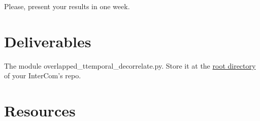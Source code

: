Please, present your results in one week.

\section{Deliverables}

The module overlapped\_ttemporal\_decorrelate.py. Store it at the
\href{https://github.com/Tecnologias-multimedia/intercom}{root
  directory} of your InterCom's repo.

\section{Resources}



\begin{comment}

  The Figure~\ref{fig:transform_coding} shows the stages that are
  tipycally involved in a transform-based signal compression system.

\begin{figure}
  \begin{center}
\begin{verbatim}
   s   +---+   w    +---+   k    +---+    c
 ----->| T |------->| Q |------->| E |-----------+
  (s)  +---+  (s)   +---+  (~s)  +---+   (~s)    |
samples   coefficients   indexes      code-words ~
                                                 :
                                                 ~
   ~s  +---+    w   +---+   k    +---+           |
 <-----| t |<-------| q |<-------| D |<----------+
  (~s) +---+  (~s)  +---+  (~s)  +---+
approx.    quantized     indexes
samples   coefficients
\end{verbatim}                
  \end{center}
  \caption{Common data-flow used un Transform Coding. $s$ represents
    the signal to compress, $\tilde{s}$ the lossy version of the
    reconstructed signal, $T$ the (forward) transform (which takes blocks of
    samples) producing blocks of coefficients $w$, $Q$ the scalar
    quantization stage (which takes single coefficients) producing
    quantization indexes $k$, $E$ the entropy encoder (which in our
    case (DEFLATE) works with blocks of coefficients) producing
    code-words $c$, $D$ the entropy decoder, $q$ the decuantization
    stage, and $t$ the inverse (or backward) transform. PCM stands for Puse Code
    Modulation and DEFLATE is the technique used to find a compact
    representation of the quantized coefficients.}
  \label{fig:transform_coding}
\end{figure}
\end{comment}

